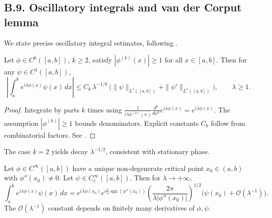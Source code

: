 
\subsection*{B.9. Oscillatory integrals and van der Corput lemma}
\label{appB:oscillatory}

We state precise oscillatory integral estimates, following \cite{SteinHA, HormanderVolI}.

\begin{lemma}
\label{lem:vanderCorput}
Let $\phi\in C^k([a,b])$, $k\ge2$, satisfy $|\phi^{(k)}(x)|\ge 1$ for all $x\in[a,b]$. Then for any $\psi\in C^1([a,b])$,
\[
\left|\int_a^b e^{i\lambda \phi(x)} \psi(x)\, dx\right|
 \le C_k\, \lambda^{-1/k}\,
\Big( \|\psi\|_{L^1([a,b])} + \|\psi'\|_{L^1([a,b])}\Big),\qquad \lambda\ge1.
\]
\end{lemma}

\begin{proof}
Integrate by parts $k$ times using $\frac{1}{i\lambda \phi^{(k)}(x)} \frac{d^k}{dx^k} e^{i\lambda \phi(x)} = e^{i\lambda \phi(x)}$. The assumption $|\phi^{(k)}|\ge1$ bounds denominators. Explicit constants $C_k$ follow from combinatorial factors. See \cite[Ch.~VIII]{SteinHA}.
\end{proof}

\begin{remark}
The case $k=2$ yields decay $\lambda^{-1/2}$, consistent with stationary phase.
\end{remark}

\begin{theorem}
\label{thm:stationary1d}
Let $\phi\in C^\infty([a,b])$ have a unique non-degenerate critical point $x_0\in(a,b)$ with $\phi''(x_0)\neq0$. Let $\psi\in C_c^\infty([a,b])$. Then for $\lambda\to+\infty$,
\[
\int_a^b e^{i\lambda \phi(x)} \psi(x)\, dx
= e^{i\lambda \phi(x_0)} e^{i\frac{\pi}{4}\operatorname{sgn}(\phi''(x_0))}
\left( \frac{2\pi}{\lambda |\phi''(x_0)|} \right)^{1/2}
\Big( \psi(x_0) + \mathcal{O}(\lambda^{-1}) \Big).
\]
The $\mathcal{O}(\lambda^{-1})$ constant depends on finitely many derivatives of $\phi,\psi$.
\end{theorem}

